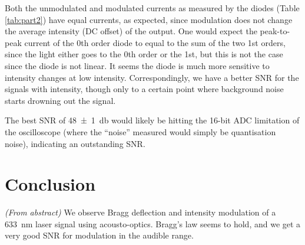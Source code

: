 \documentclass[a4paper]{scrartcl}
\begin{document}
Both the unmodulated and modulated currents as measured by the diodes (Table \ref{tab:part2}) have equal currents, as expected, since modulation does not change the average intensity (DC offset) of the output. One would expect the peak-to-peak current of the 0th order diode to equal to the sum of the two 1st orders, since the light either goes to the 0th order or the 1st, but this is not the case since the diode is not linear. It seems the diode is much more sensitive to intensity changes at low intensity. Correspondingly, we have a better SNR for the signals with intensity, though only to a certain point where background noise starts drowning out the signal.

The best SNR of \SI{48 \pm 1}{\decibel} would likely be hitting the 16-bit ADC limitation of the oscilloscope (where the ``noise'' measured would simply be quantisation noise), indicating an outstanding SNR.

\section{Conclusion}
\emph{(From abstract)} We observe Bragg deflection and intensity modulation of a \SI{633}{\nano\metre} laser signal using acousto-optics. Bragg's law seems to hold, and we get a very good SNR for modulation in the audible range.
\end{document}
